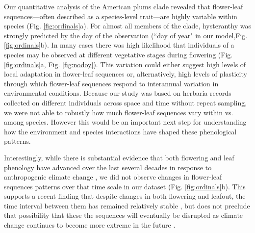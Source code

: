 \documentclass{article}[12pt]
\begin{document}
{Our quantitative analysis of the American plums clade revealed that flower-leaf sequences---often described as a species-level trait---are highly variable within species (Fig. \ref{fig:ordinals}a). For almost all members of the clade, hysteranthy was strongly predicted by the day of the observation (``day of year" in our model,Fig. \ref{fig:ordinals}b). In many cases there was high likelihood that individuals of a species may be observed at different vegetative stages during flowering (Fig. \ref{fig:ordinals}a, Fig. \ref{fig:nodoy}). This variation could either suggest high levels of local adaptation in flower-leaf sequences or, alternatively, high levels of plasticity through which flower-leaf sequences respond to interannual variation in environmental conditions. Because our study was based on herbaria records collected on different individuals across space and time without repeat sampling, we were not able to robustly how much flower-leaf sequences vary within vs. among species. However this would be an important next step for understanding how the environment and species interactions have shaped these phenological patterns.

Interestingly, while there is substantial evidence that both flowering and leaf phenology have advanced over the last several decades in response to anthropogenic climate change \citep{Menzel2006,Cleland2007,Augspurger:2020aa}, we did not observe changes in flower-leaf sequences patterns over that time scale in our dataset (Fig. \ref{fig:ordinals}b). This supports a recent finding that despite changes in both flowering and leafout, the time interval between them has remained relatively stable \citep{Guo:2023wb}, but does not preclude that possibility that these the sequences will eventually be disrupted as climate change continues to become more extreme in the future \citep{Buonaiuto_2021}.

}
\end{document}
